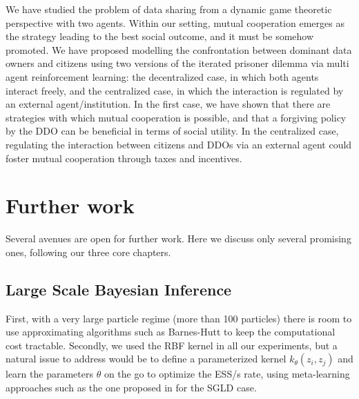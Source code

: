 
We have studied the problem of data sharing
from a dynamic game theoretic perspective with two agents.
Within our setting,  mutual cooperation emerges as the strategy 
leading to the best social outcome, and it must be somehow promoted. We
have proposed modelling the confrontation between dominant data owners and citizens using two versions of the iterated prisoner dilemma via  
multi agent reinforcement learning: the decentralized case, in which both agents interact freely, and the centralized case, in which the interaction is regulated by an external agent/institution. In the first case, we have shown that there are strategies with which mutual cooperation is possible, and that a forgiving policy by the DDO can be beneficial in terms of social utility. In the centralized case, regulating the interaction between citizens and DDOs via an external agent could foster mutual cooperation through taxes and incentives.


\section{Further work}
Several avenues are open for further work. Here we discuss only several promising ones, following our three core chapters.


\subsection{Large Scale Bayesian Inference}
 First, with a very large particle regime (more than 100 particles) there is room to use approximating algorithms such as Barnes-Hutt to keep the computational cost tractable.
Secondly, we used the RBF kernel in all our experiments, but a natural 
issue to address would be to define a parameterized kernel $k_{\theta} (z_i, z_j)$ and learn the parameters $\theta$ on the go to optimize the ESS/s rate, using meta-learning approaches such as the one proposed in \cite{gallego2019vis} for the SGLD case.

